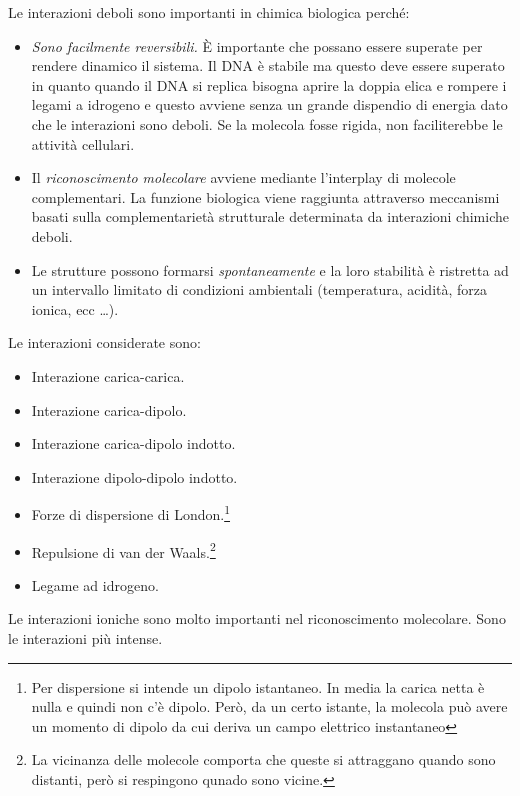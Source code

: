 
Le interazioni deboli sono importanti in chimica biologica perché:
\begin{itemize}
\item
  \emph{Sono facilmente reversibili.} È importante che possano essere superate per rendere dinamico il sistema. Il DNA è stabile ma questo deve essere superato in quanto
  quando il DNA si replica bisogna aprire la doppia elica e rompere i
  legami a idrogeno e questo avviene senza un grande dispendio di
  energia dato che le interazioni sono deboli. Se la molecola fosse rigida, non faciliterebbe le attività cellulari.
\item
  Il \emph{riconoscimento molecolare} avviene mediante l'interplay di molecole
  complementari. La funzione biologica viene raggiunta attraverso
  meccanismi basati sulla complementarietà strutturale determinata da
  interazioni chimiche deboli.
\item
  Le strutture possono formarsi \emph{spontaneamente} e la loro stabilità è
  ristretta ad un intervallo limitato di condizioni ambientali
  (temperatura, acidità, forza ionica, ecc \ldots).
\end{itemize}

Le interazioni considerate sono:
\begin{itemize}
  \item Interazione carica-carica.
  \item Interazione carica-dipolo.
  \item Interazione carica-dipolo indotto.
  \item Interazione dipolo-dipolo indotto.
  \item Forze di dispersione di London.\footnote{Per dispersione si intende un dipolo istantaneo. In media la carica netta è nulla e quindi non c'è dipolo. Però, da un certo istante, la molecola può avere un momento di dipolo da cui deriva un campo elettrico instantaneo}
  \item Repulsione di van der Waals.\footnote{La vicinanza delle molecole comporta che queste si attraggano quando sono distanti, però si respingono qunado sono vicine.}
  \item Legame ad idrogeno.
\end{itemize}

Le interazioni ioniche sono molto importanti nel riconoscimento molecolare. Sono le interazioni più intense.

